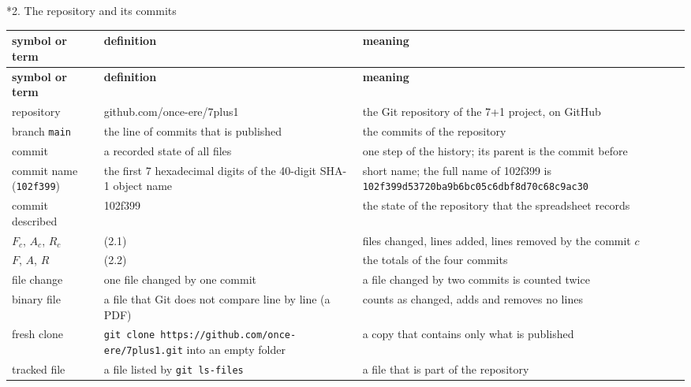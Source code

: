 \documentclass[10pt,a4paper]{article}
\makeatletter
\renewcommand\section{\@startsection{section}{1}{\z@}{-3.5ex \@plus -1ex \@minus -.2ex}{2.3ex \@plus.2ex}{\normalfont\Large\bfseries\raggedright}}
\makeatother
\begin{document}
\section*{2. The repository and its commits}
{\footnotesize
\begin{longtable}{>{\raggedright\arraybackslash}p{}>{\raggedright\arraybackslash}p{}>{\raggedright\arraybackslash}p{}}
\toprule
\textbf{symbol or term} & \textbf{definition} & \textbf{meaning} \\
\midrule\endfirsthead
\toprule
\textbf{symbol or term} & \textbf{definition} & \textbf{meaning} \\
\midrule\endhead
\endfoot
\bottomrule\endlastfoot
repository & github.com/once-ere/7plus1 & the Git repository of the 7+1 project, on GitHub \\
branch \texttt{main} & the line of commits that is published & the commits of the repository \\
commit & a recorded state of all files & one step of the history; its parent is the commit before \\
commit name (\texttt{102f399}) & the first 7 hexadecimal digits of the 40-digit SHA-1 object name & short name; the full name of 102f399 is \texttt{102f399d\allowbreak{}53720ba9\allowbreak{}b6bc05c6\allowbreak{}dbf8d70c\allowbreak{}68c9ac30} \\
commit described & 102f399 & the state of the repository that the spreadsheet records \\
$F_c$, $A_c$, $R_c$ & (2.1) & files changed, lines added, lines removed by the commit $c$ \\
$F$, $A$, $R$ & (2.2) & the totals of the four commits \\
file change & one file changed by one commit & a file changed by two commits is counted twice \\
binary file & a file that Git does not compare line by line (a PDF) & counts as changed, adds and removes no lines \\
fresh clone & \texttt{git clone https:/\allowbreak{}/\allowbreak{}github.com/\allowbreak{}once-ere/\allowbreak{}7plus1.git} into an empty folder & a copy that contains only what is published \\
tracked file & a file listed by \texttt{git ls-files} & a file that is part of the repository \\

\end{longtable}}
\end{document}

